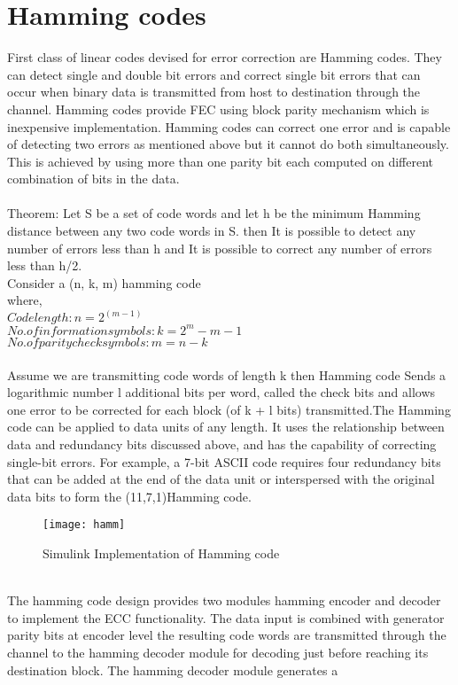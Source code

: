 \documentclass[conference]{IEEEtran}
\begin{document}
\section{Hamming codes}
 First class of linear codes devised for error correction are Hamming codes. They can detect single and double bit errors and correct single bit errors that can occur when binary data is transmitted from host to destination through the channel. Hamming codes provide FEC using block parity mechanism which is inexpensive implementation. Hamming codes can correct one error and is capable of detecting two errors as mentioned above but it cannot do both simultaneously. This is achieved by using more than one parity bit each computed on different combination of bits in the data.\\
 \\
Theorem: Let S be a set of code words and let h be the minimum Hamming distance between any two code words in S. then It is possible to detect any number of errors less than h and It is possible to correct any number of errors less than h/2.\\
Consider a (n, k, m) hamming code\\
where,\\   
$ Code length : n = 2^{(m -1)} $\\
$ No. of information symbols : k = 2^m - m -1 $\\        
$ No. of parity check symbols : m = n-k $\\     
\\ 
Assume we are transmitting code words of length k then Hamming code Sends a logarithmic number l additional bits per word, called the check bits and allows one error to be corrected for each block (of k + l bits) transmitted.The Hamming code can be applied to data units of any length. It uses the relationship between data and redundancy bits discussed above, and has the capability of correcting single-bit errors. For example, a 7-bit ASCII code requires four redundancy bits that can be added at the end of the data unit or interspersed with the original data bits to form the (11,7,1)Hamming code.\\
\begin{figure}[h]
\texttt{[image: hamm]}
\caption{Simulink Implementation of Hamming code}
\label{fig:hamm}
\end{figure}\\
The hamming code design provides two modules hamming encoder and decoder to implement the ECC functionality. The data input  is combined with generator parity bits at encoder level the resulting code words are transmitted through the channel to the hamming decoder module for decoding just before reaching its destination block. The hamming decoder module generates a
\end{document}
